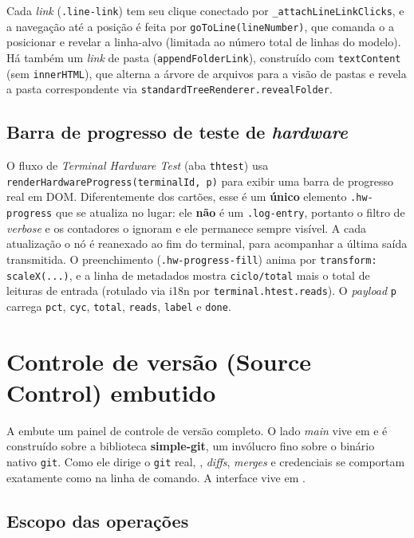 Cada \textit{link} (\lstinline|.line-link|) tem seu clique conectado por
\lstinline|_attachLineLinkClicks|, e a navegação até a posição é feita por
\lstinline|goToLine(lineNumber)|, que comanda o  a posicionar e
revelar a linha-alvo (limitada ao número total de linhas do modelo). Há também
um \textit{link} de pasta (\lstinline|appendFolderLink|), construído com
\lstinline|textContent| (sem \lstinline|innerHTML|), que alterna a árvore de
arquivos para a visão de pastas e revela a pasta correspondente via
\lstinline|standardTreeRenderer.revealFolder|.

\subsection{Barra de progresso de teste de \textit{hardware}}

O fluxo de \textit{Terminal Hardware Test} (aba \lstinline|thtest|) usa
\lstinline|renderHardwareProgress(terminalId, p)| para exibir uma barra de
progresso real em DOM. Diferentemente dos cartões, esse é um \textbf{único}
elemento \lstinline|.hw-progress| que se atualiza no lugar: ele \textbf{não} é
um \lstinline|.log-entry|, portanto o filtro de \textit{verbose} e os
contadores o ignoram e ele permanece sempre visível. A cada atualização o nó é
reanexado ao fim do terminal, para acompanhar a última saída transmitida. O
preenchimento (\lstinline|.hw-progress-fill|) anima por
\lstinline|transform: scaleX(...)|, e a linha de metadados mostra
\lstinline|ciclo/total| mais o total de leituras de entrada (rotulado via
i18n por \lstinline|terminal.htest.reads|). O \textit{payload} \lstinline|p|
carrega \lstinline|pct|, \lstinline|cyc|, \lstinline|total|, \lstinline|reads|,
\lstinline|label| e \lstinline|done|.

\section{Controle de versão (Source Control) embutido}
\label{sec:13-git}

A  embute um painel de controle de versão completo. O lado
\textit{main} vive em  e é construído sobre a biblioteca
\textbf{simple-git}, um invólucro fino sobre o binário nativo \lstinline|git|.
Como ele dirige o \lstinline|git| real, , \textit{diffs},
\textit{merges} e credenciais se comportam exatamente como na linha de comando.
A interface vive em .

\subsection{Escopo das operações}

